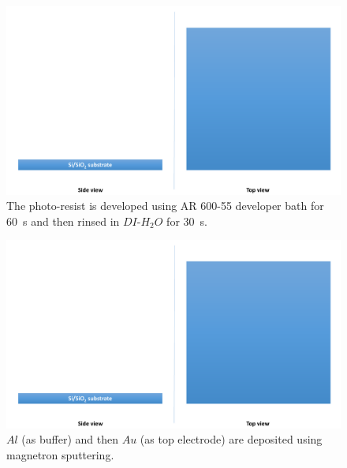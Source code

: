 \begin{multicols}{2}[]
    
    \begin{figure}[H]
        \centering
        \includegraphics[width=0.375\paperwidth, page=17]{img/04/Manufacturing_under.pdf}
        \caption{The photo-resist is developed using AR 600-55 developer bath for \SI{60}{\second} and then rinsed in $DI$-$H_2O$ for \SI{30}{\second}.}
        \label{FabricationTopDeveloping}
    \end{figure}
    
    \begin{figure}[H]
        \centering
        \includegraphics[width=0.375\paperwidth, page=18]{img/04/Manufacturing_under.pdf}
        \caption{$Al$ (as buffer) and then $Au$ (as top electrode) are deposited using magnetron sputtering.}
        \label{FabricationTopSputtering}
    \end{figure}
    
\end{multicols}
